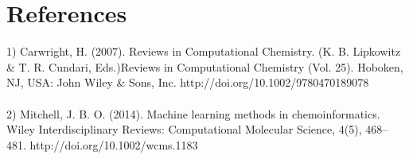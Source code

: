 \documentclass{revtex4}
\begin{document}
\section{References}

1) Carwright, H. (2007). Reviews in Computational Chemistry. (K. B. Lipkowitz \& T. R. Cundari, Eds.)Reviews in Computational Chemistry (Vol. 25). Hoboken, NJ, USA: John Wiley \& Sons, Inc. http://doi.org/10.1002/9780470189078
\\ \\
2) Mitchell, J. B. O. (2014). Machine learning methods in chemoinformatics. Wiley Interdisciplinary Reviews: Computational Molecular Science, 4(5), 468–481. http://doi.org/10.1002/wcms.1183
\end{document}
